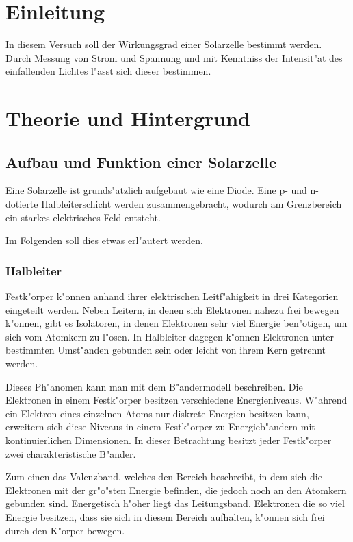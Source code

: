 \section{Einleitung}
	\label{sec:einleitung}
	In diesem Versuch soll der Wirkungsgrad einer Solarzelle bestimmt werden.
	Durch Messung von Strom und Spannung und mit Kenntniss der Intensit"at des einfallenden Lichtes l"asst sich dieser bestimmen.


\section{Theorie und Hintergrund}
	\label{sec:theorie}

	\subsection{Aufbau und Funktion einer Solarzelle}
		\label{subsec:aufbau_funktion}
		Eine Solarzelle ist grunds"atzlich aufgebaut wie eine Diode.
		Eine p- und n-dotierte Halbleiterschicht werden zusammengebracht, wodurch am Grenzbereich ein starkes elektrisches Feld entsteht.

		Im Folgenden soll dies etwas erl"autert werden.

		\subsubsection{Halbleiter}
			\label{subsub:halbleiter}
			Festk"orper k"onnen anhand ihrer elektrischen Leitf"ahigkeit in drei Kategorien eingeteilt werden.
			Neben Leitern, in denen sich Elektronen nahezu frei bewegen k"onnen, gibt es Isolatoren, in denen Elektronen sehr viel Energie ben"otigen, um sich vom Atomkern zu l"osen.
			In Halbleiter dagegen k"onnen Elektronen unter bestimmten Umst"anden gebunden sein oder leicht von ihrem Kern getrennt werden.

			
			Dieses Ph"anomen kann man mit dem B"andermodell beschreiben.
			Die Elektronen in einem Festk"orper besitzen verschiedene Energieniveaus.
			W"ahrend ein Elektron eines einzelnen Atoms nur diskrete Energien besitzen kann, erweitern sich diese Niveaus in einem Festk"orper zu Energieb"andern mit kontinuierlichen Dimensionen.
			In dieser Betrachtung besitzt jeder Festk"orper zwei charakteristische B"ander.

			Zum einen das Valenzband, welches den Bereich beschreibt, in dem sich die Elektronen mit der gr"o"sten Energie befinden, die jedoch noch an den Atomkern gebunden sind.
			Energetisch h"oher liegt das Leitungsband.
			Elektronen die so viel Energie besitzen, dass sie sich in diesem Bereich aufhalten, k"onnen sich frei durch den K"orper bewegen.
			
